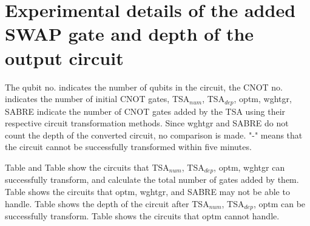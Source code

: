 \documentclass[journal]{IEEEtran}
\newcommand{\RNum}[1]{\uppercase\expandafter{\romannumeral #1\relax}}
\begin{document}


\appendices
\section{Experimental details of the added SWAP gate and depth of the output circuit}
The qubit no. indicates the number of qubits in the circuit, the CNOT no. indicates the number of initial CNOT gates, TSA$_{num}$, TSA$_{dep}$, optm, wghtgr, SABRE indicate the number of CNOT gates added by the TSA using their respective circuit transformation methods. Since wghtgr and SABRE do not count the depth of the converted circuit, no comparison is made. "-" means that the circuit cannot be successfully transformed within five minutes.

Table \RNum{3} and Table \RNum{4} show the circuits that TSA$_{num}$, TSA$_{dep}$, optm, wghtgr can successfully transform, and calculate the total number of gates added by them. Table \RNum{5} shows the circuits that optm, wghtgr, and SABRE may not be able to handle. Table \RNum{6} \RNum{7} shows the depth of the circuit after TSA$_{num}$, TSA$_{dep}$, optm can be successfully transform.  Table \RNum{8} shows the circuits that optm cannot handle.
\end{document}
